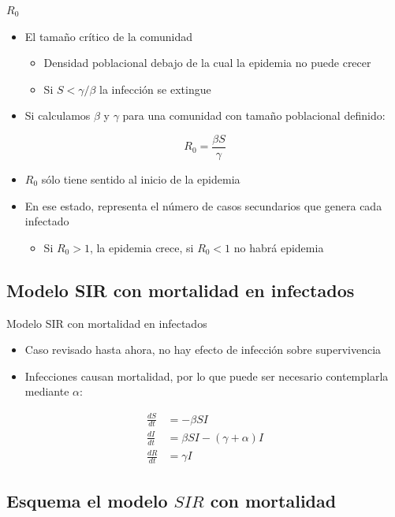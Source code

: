 \documentclass[
  11pt,
  ignorenonframetext,
]{beamer}
\providecommand{\tightlist}{%
  \setlength{\itemsep}{0pt}\setlength{\parskip}{0pt}}
\begin{document}
\begin{frame}{\(R_0\)}
\begin{itemize}
\item
  El tamaño crítico de la comunidad

  \begin{itemize}
  \item
    Densidad poblacional debajo de la cual la epidemia no puede crecer
  \item
    Si \(S < \gamma / \beta\) la infección se extingue
  \end{itemize}
\item
  Si calculamos \(\beta\) y \(\gamma\) para una comunidad con tamaño
  poblacional definido:
\end{itemize}

\[R_0 = \frac{\beta S}{\gamma}\]

\begin{itemize}
\item
  \(R_0\) sólo tiene sentido al inicio de la epidemia
\item
  En ese estado, representa el número de casos secundarios que genera
  cada infectado

  \begin{itemize}
  \tightlist
  \item
    Si \(R_0 > 1\), la epidemia crece, si \(R_0 < 1\) no habrá epidemia
  \end{itemize}
\end{itemize}
\end{frame}

\hypertarget{modelo-sir-con-mortalidad-en-infectados}{%
\subsection{Modelo SIR con mortalidad en
infectados}\label{modelo-sir-con-mortalidad-en-infectados}}

\begin{frame}{Modelo SIR con mortalidad en infectados}
\begin{itemize}
\item
  Caso revisado hasta ahora, no hay efecto de infección sobre
  supervivencia
\item
  Infecciones causan mortalidad, por lo que puede ser necesario
  contemplarla mediante \(\alpha\):
\end{itemize}

\begin{align}
\frac{dS}{dt} &= -\beta SI \\
\frac{dI}{dt} &= \beta SI - (\gamma + \alpha) I \\
\frac{dR}{dt} &= \gamma I
\end{align}
\end{frame}

\hypertarget{esquema-el-modelo-sir-con-mortalidad}{%
\subsection{\texorpdfstring{Esquema el modelo \(SIR\) con
mortalidad}{Esquema el modelo SIR con mortalidad}}\label{esquema-el-modelo-sir-con-mortalidad}}
\end{document}
